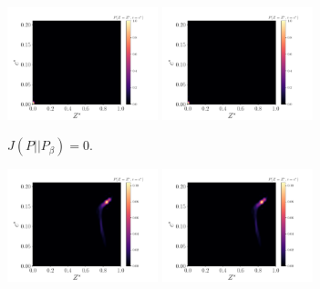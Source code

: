 \documentclass[review]{elsarticle}
\begin{document}
\begin{figure}[!tbp]%
  \centering%
  \begin{subfigure}[t]{\textwidth}%
    \includegraphics[page=3,width=0.48\textwidth, trim=0.2cm 0cm 1.5cm 1.3cm, clip=true]{./figs/pdfs_50429.pdf}\hfill%
    \includegraphics[page=4,width=0.48\textwidth, trim=0.2cm 0cm 1.5cm 1.3cm, clip=true]{./figs/pdfs_50429.pdf}%
    \caption{$J(P||P_{\beta})=0$.}\label{fig:}%
  \end{subfigure}\hfill%
  \begin{subfigure}[t]{\textwidth}%
    \includegraphics[page=3,width=0.48\textwidth, trim=0.2cm 0cm 1.5cm 1.3cm, clip=true]{./figs/pdfs_44209.pdf}\hfill%
    \includegraphics[page=4,width=0.48\textwidth, trim=0.2cm 0cm 1.5cm 1.3cm, clip=true]{./figs/pdfs_44209.pdf}%

\end{subfigure}
\end{figure}
\end{document}

